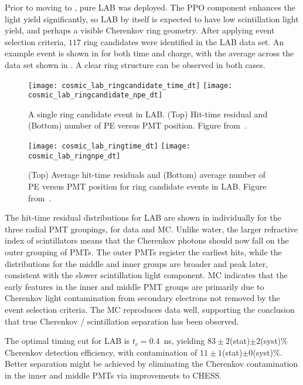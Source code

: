 Prior to moving to {\labppo}, pure LAB was deployed. 
The PPO component enhances the light yield significantly, so LAB by itself is expected to have low scintillation light yield, and perhaps a visible Cherenkov ring geometry.
After applying event selection criteria, $117$ ring candidates were identified in the LAB data set. 
An example event is shown in  for both time and charge, with the average across the data set shown in . 
A clear ring structure can be observed in both cases. 

\begin{figure}
	\centering
	\texttt{[image: cosmic\_lab\_ringcandidate\_time\_dt]}
	\texttt{[image: cosmic\_lab\_ringcandidate\_npe\_dt]}
	\caption{A single ring candidate event in LAB. (Top) Hit-time residual and (Bottom) number of PE versus PMT position. Figure from~\cite{chess_lab}.}
	\label{fig:lab_ring}
\end{figure}

\begin{figure}
	\centering
	\texttt{[image: cosmic\_lab\_ringtime\_dt]}
	\texttt{[image: cosmic\_lab\_ringnpe\_dt]}
	\caption{(Top) Average hit-time residuals and (Bottom) average number of PE versus PMT position for ring candidate events in LAB. Figure from~\cite{chess_lab}.}
	\label{fig:lab2}
\end{figure}


The hit-time residual distributions for LAB are shown in  individually for the three radial PMT groupings, for data and MC. 
Unlike water, the larger refractive index of scintillators means that the Cherenkov photons should now fall on the outer grouping of PMTs.
The outer PMTs register the earliest hits, while the distributions for the middle and inner groups are broader and peak later, consistent with the slower scintillation light component. 
MC indicates that the early features in the inner and middle PMT groups are primarily due to Cherenkov light contamination from secondary electrons not removed by the event selection criteria.
The MC reproduces data well, supporting the conclusion that true Cherenkov / scintillation separation has been observed. 

The optimal timing cut for LAB is $ t_c = 0.4$~ns,  yielding $83\pm2$(stat)$\pm2$(syst)\% Cherenkov detection efficiency, with contamination of $11\pm1$(stat)$\pm0$(syst)\%. 
Better separation might be achieved by eliminating the Cherenkov contamination in the inner and middle PMTs via improvements to CHESS.

